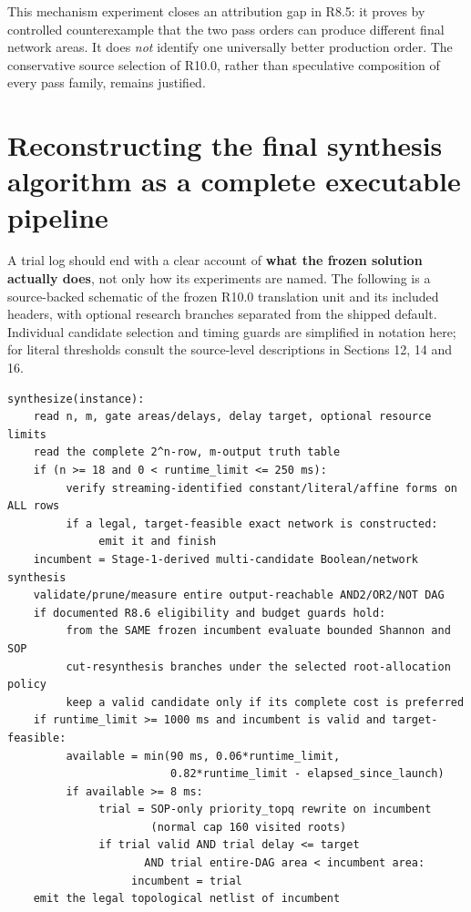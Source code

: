This mechanism experiment closes an attribution gap in R8.5: it proves by controlled counterexample that the two pass orders can produce different final network areas. It does \emph{not} identify one universally better production order. The conservative source selection of R10.0, rather than speculative composition of every pass family, remains justified.

\section{Reconstructing the final synthesis algorithm as a complete executable pipeline}\label{reconstructing-the-final-synthesis-algorithm-as-a-complete-executable-pipeline}

A trial log should end with a clear account of \textbf{what the frozen solution actually does}, not only how its experiments are named. The following is a source-backed schematic of the frozen R10.0 translation unit and its included headers, with optional research branches separated from the shipped default. Individual candidate selection and timing guards are simplified in notation here; for literal thresholds consult the source-level descriptions in Sections 12, 14 and 16.

\begin{verbatim}
synthesize(instance):
    read n, m, gate areas/delays, delay target, optional resource limits
    read the complete 2^n-row, m-output truth table
    if (n >= 18 and 0 < runtime_limit <= 250 ms):
         verify streaming-identified constant/literal/affine forms on ALL rows
         if a legal, target-feasible exact network is constructed:
              emit it and finish
    incumbent = Stage-1-derived multi-candidate Boolean/network synthesis
    validate/prune/measure entire output-reachable AND2/OR2/NOT DAG
    if documented R8.6 eligibility and budget guards hold:
         from the SAME frozen incumbent evaluate bounded Shannon and SOP
         cut-resynthesis branches under the selected root-allocation policy
         keep a valid candidate only if its complete cost is preferred
    if runtime_limit >= 1000 ms and incumbent is valid and target-feasible:
         available = min(90 ms, 0.06*runtime_limit,
                         0.82*runtime_limit - elapsed_since_launch)
         if available >= 8 ms:
              trial = SOP-only priority_topq rewrite on incumbent
                      (normal cap 160 visited roots)
              if trial valid AND trial delay <= target
                     AND trial entire-DAG area < incumbent area:
                   incumbent = trial
    emit the legal topological netlist of incumbent
\end{verbatim}

